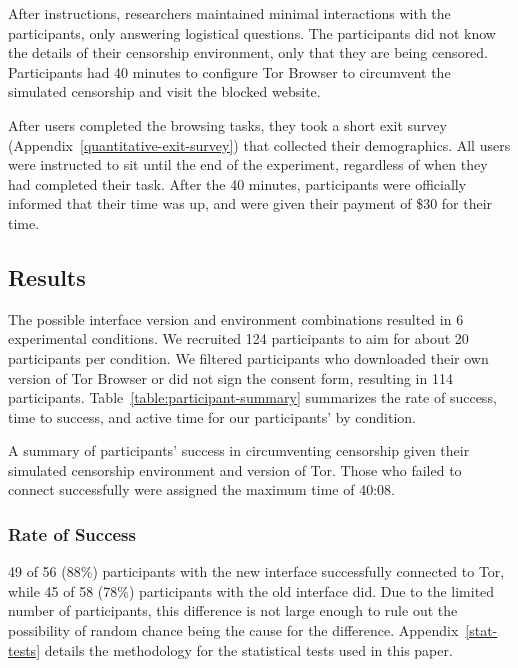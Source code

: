 \documentclass[USenglish,oneside,twocolumn]{article}
\begin{document}
After instructions, researchers maintained minimal interactions with the participants, 
only answering logistical questions.
The participants did not know the details of their censorship environment,
only that they are being censored. Participants had 40 minutes to configure Tor Browser to 
circumvent the simulated censorship and visit the blocked website. 

After users completed the browsing tasks, they took a short exit survey (Appendix~\ref{quantitative-exit-survey})
that collected their demographics. All users were instructed to sit until the end of the experiment,
regardless of when they had completed their task. After the 40 minutes, 
participants were officially informed that their time was up, and were given their payment of 
\$30 for their time. 

\subsection{Results} 
The possible interface version and environment combinations resulted in 6 experimental conditions. We recruited 124 participants to aim for about 20 participants per condition. We filtered participants who downloaded their own version of Tor Browser or did not sign the consent form, resulting in 114 participants. Table~\ref{table:participant-summary} summarizes the rate of success, time to success, and active time for our participants' by condition. 

\begin{table}
\centering

\caption{
A summary of participants' success in circumventing censorship
given their simulated censorship environment and version of Tor. Those who
failed to connect successfully were assigned the maximum time of 40:08.
}
\label{table:participant-summary}
\end{table}

\subsubsection{Rate of Success} 
49 of 56 (88\%) participants with the new interface successfully connected to Tor, while 45 of 58 (78\%) participants with the old interface did. Due to the limited number of participants, this difference is not large enough to rule out the possibility of random chance being the cause for the difference. Appendix~\ref{stat-tests} details the methodology for the statistical tests used in this paper. 
\end{document}
